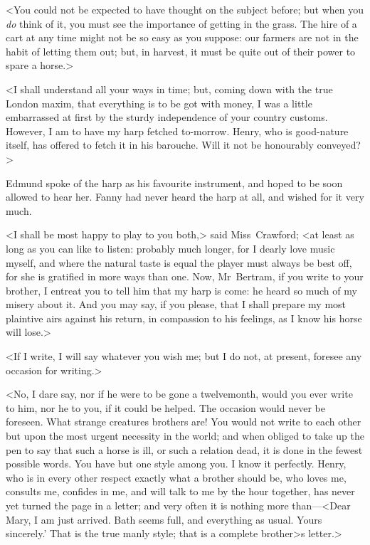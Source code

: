 <You could not be expected to have thought on the subject before; but when you \textit{do}  think of it, you must see the importance of getting in the grass. The hire of a cart at any time might not be so easy as you suppose: our farmers are not in the habit of letting them out; but, in harvest, it must be quite out of their power to spare a horse.>

<I shall understand all your ways in time; but, coming down with the true London maxim, that everything is to be got with money, I was a little embarrassed at first by the sturdy independence of your country customs. However, I am to have my harp fetched to-morrow. Henry, who is good-nature itself, has offered to fetch it in his barouche. Will it not be honourably conveyed?>

Edmund spoke of the harp as his favourite instrument, and hoped to be soon allowed to hear her. Fanny had never heard the harp at all, and wished for it very much.

<I shall be most happy to play to you both,> said Miss~Crawford; <at least as long as you can like to listen: probably much longer, for I dearly love music myself, and where the natural taste is equal the player must always be best off, for she is gratified in more ways than one. Now, Mr~Bertram, if you write to your brother, I entreat you to tell him that my harp is come: he heard so much of my misery about it. And you may say, if you please, that I shall prepare my most plaintive airs against his return, in compassion to his feelings, as I know his horse will lose.>

<If I write, I will say whatever you wish me; but I do not, at present, foresee any occasion for writing.>

<No, I dare say, nor if he were to be gone a twelvemonth, would you ever write to him, nor he to you, if it could be helped. The occasion would never be foreseen. What strange creatures brothers are! You would not write to each other but upon the most urgent necessity in the world; and when obliged to take up the pen to say that such a horse is ill, or such a relation dead, it is done in the fewest possible words. You have but one style among you. I know it perfectly. Henry, who is in every other respect exactly what a brother should be, who loves me, consults me, confides in me, and will talk to me by the hour together, has never yet turned the page in a letter; and very often it is nothing more than—<Dear Mary, I am just arrived. Bath seems full, and everything as usual. Yours sincerely.' That is the true manly style; that is a complete brother>s letter.>

